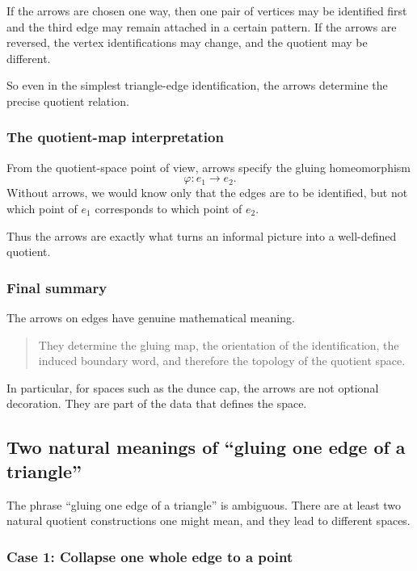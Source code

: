 \documentclass[12pt,a4paper]{article}
\theoremstyle{notespace}
\begin{document}
If the arrows are chosen one way, then one pair of vertices may be identified first and the third edge may remain attached in a certain pattern. If the arrows are reversed, the vertex identifications may change, and the quotient may be different.

So even in the simplest triangle-edge identification, the arrows determine the precise quotient relation.

\subsubsection{The quotient-map interpretation}

From the quotient-space point of view, arrows specify the gluing homeomorphism
\[
\varphi:e_1\to e_2.
\]
Without arrows, we would know only that the edges are to be identified, but not which point of \(e_1\) corresponds to which point of \(e_2\).

Thus the arrows are exactly what turns an informal picture into a well-defined quotient.

\subsubsection{Final summary}

The arrows on edges have genuine mathematical meaning.

\begin{quote}
	They determine the gluing map, the orientation of the identification, the induced boundary word, and therefore the topology of the quotient space.
\end{quote}

In particular, for spaces such as the dunce cap, the arrows are not optional decoration. They are part of the data that defines the space.

\subsection{Two natural meanings of ``gluing one edge of a triangle''}

The phrase ``gluing one edge of a triangle'' is ambiguous. There are at least two natural quotient constructions one might mean, and they lead to different spaces.

\subsubsection{Case 1: Collapse one whole edge to a point}
\end{document}
